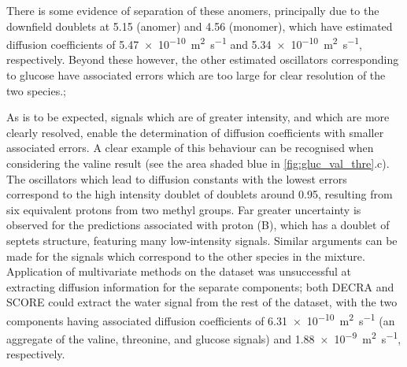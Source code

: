 There is some evidence of separation of these anomers, principally due
to the downfield doublets at \qty{5.15}{\partspermillion} (\textalpha anomer) and
\qty{4.56}{\partspermillion} (\textbeta monomer), which have estimated diffusion
coefficients of \qty{5.47e-10}{\meter\squared\per\second}
and \qty{5.34e-10}{\meter\squared\per\second}, respectively. Beyond these
however, the other estimated oscillators corresponding to glucose have
associated errors which are too large for clear resolution of the two species.;

As is to be expected, signals which are of greater intensity, and which are
more clearly resolved, enable the determination of diffusion coefficients with
smaller associated errors. A clear example of this behaviour can be recognised when
considering the valine result (see the area shaded blue in
\cref{fig:gluc_val_thre}.c). The
oscillators which lead to diffusion constants with the lowest errors correspond to
the high intensity doublet of doublets around \qty{0.95}{\partspermillion},
resulting from six equivalent protons from two methyl groups. Far
greater uncertainty is observed for the predictions associated with proton (B),
which has a doublet of septets structure, featuring many low-intensity signals.
Similar arguments can be made for the signals which correspond to the other
species in the mixture.
Application of multivariate methods on the dataset was unsuccessful at
extracting diffusion information for the separate components; both
\ac{DECRA} and \ac{SCORE} could extract the water
signal from the rest of the dataset, with the two components having associated
diffusion coefficients of \qty{6.31e-10}{\meter\squared\per\second} (an
aggregate of the valine, threonine, and glucose signals) and
\qty{1.88e-9}{\meter\squared\per\second}, respectively.
